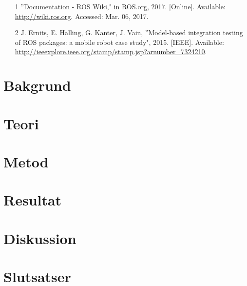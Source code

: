 \begin{itemize}
	\item [1] \textquotedblright Documentation - ROS Wiki," in ROS.org, 2017. [Online]. Available: \url{http://wiki.ros.org}. Accessed: Mar. 06, 2017.
	\item [2] J. Ernits, E. Halling, G. Kanter, J. Vain, \textquotedblright Model-based integration testing of ROS packages:
	a mobile robot case study", 2015. [IEEE]. Available: \url{http://ieeexplore.ieee.org/stamp/stamp.jsp?arnumber=7324210}.	
\end{itemize}

\section{Bakgrund}
\label{sec:background-holmberg}


\section{Teori}
\label{sec:theory-holmberg}


\section{Metod}
\label{sec:method-holmberg}


\section{Resultat}
\label{sec:results-holmberg}


\section{Diskussion}
\label{sec:discussion-holmberg}


\section{Slutsatser}
\label{sec:conclusions-holmberg}


